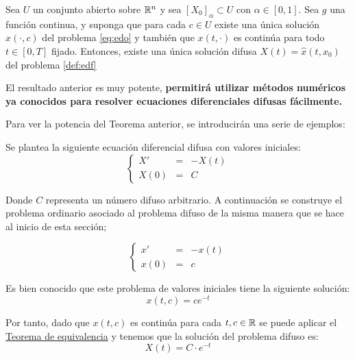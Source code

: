 \begin{teorema}
	\label{teorema:equivalencia}
	Sea $U$ un conjunto abierto sobre $\mathbb R^n$ y sea $[X_0]_\alpha \subset U$ con $\alpha \in [0, 1]$. Sea $g$ una función continua, y suponga que para cada $c \in U$ existe una única solución $x(\cdot, c)$ del problema \ref{eq:edo} y también que $x(t, \cdot)$ es continúa para todo $t \in [0, T]$ fijado. Entonces, existe una única solución difusa $X(t) = \hat{x}(t, x_0)$ del problema \ref{def:edf}
\end{teorema}
El resultado anterior es muy potente, \textbf{permitirá utilizar métodos numéricos ya conocidos para resolver ecuaciones diferenciales difusas fácilmente.}

Para ver la potencia del Teorema anterior, se introducirán una serie de ejemplos:

\begin{ejemplo}
	Se plantea la siguiente ecuación diferencial difusa con valores iniciales:
	\[
		\left\{
			\begin{array}{ccc}
				X' & = & - X(t) \\
				X(0) & =  & C
			\end{array}
		\right.
	\]
	
	Donde $C$ representa un número difuso arbitrario. A continuación se construye el problema ordinario asociado al problema difuso de la misma manera que se hace al inicio de esta sección;
	
	\[
		\left\{
			\begin{array}{ccc}
				x' & = & - x(t) \\
				x(0) & =  & c
			\end{array}
		\right.
	\]
	
	Es bien conocido que este problema de valores iniciales tiene la siguiente solución:
	\[
		x(t, c) = c e^{-t}
	\]
	
	Por tanto, dado que $x(t, c)$ es continúa para cada $t, c \in \mathbb R$ se puede aplicar el \hyperref[teorema:equivalencia]{Teorema de equivalencia} y tenemos que la solución del problema difuso es:
	\[
		X(t) = C \cdot e^{-t}
	\]
\end{ejemplo}

